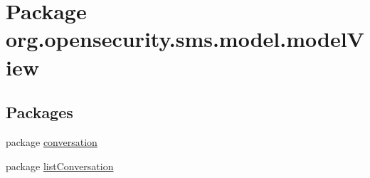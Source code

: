 \hypertarget{a00037}{\section{Package org.\+opensecurity.\+sms.\+model.\+model\+View}
\label{a00037}
}
\subsection*{Packages}
\begin{DoxyCompactItemize}
\item 
package \hyperlink{a00038}{conversation}
\item 
package \hyperlink{a00039}{list\+Conversation}
\end{DoxyCompactItemize}

